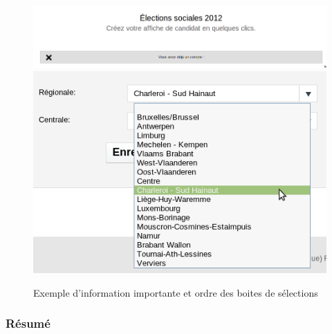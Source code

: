 \documentclass{article}
\begin{document}
\begin{sffamily}
\begin{figure}[h!]
	\begin{center}
		\includegraphics[scale=0.3]{ergo_010.png}
		\includegraphics[scale=0.3]{ergo_018.png}
		\caption{Exemple d'information importante et ordre des boites de sélections}
	\end{center}
\end{figure}

\subsubsection*{Résumé}


\end{sffamily}
\end{document}
